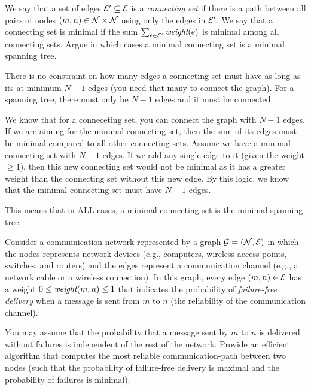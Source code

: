 \begin{problem}
\begin{questions}
\item We say that a set of edges $\mathcal{E}' \subseteq \mathcal{E}$ is a \emph{connecting set} if there is a path between all pairs of nodes $(m, n) \in \mathcal{N}\times\mathcal{N}$ using only the edges in $\mathcal{E}'$. We say that a connecting set is minimal if the sum $\sum_{e \in \mathcal{E}'} \mathord{\textit{weight}}(e)$ is minimal among all connecting sets. Argue in which cases a minimal connecting set is a minimal spanning tree.

There is no constraint on how many edges a connecting set must have as long as its at minimum $N-1$ edges (you need that many to connect the graph).
For a spanning tree, there must only be $N-1$ edges and it must be connected.

We know that for a conneceting set, you can connect the graph with $N-1$ edges. If we are aiming for the minimal connecting set, then the sum of its edges must be minimal compared to all other connecting sets. 
Assume we have a minimal connecting set with $N-1$ edges. If we add any single edge to it (given the weight $\geq 1$), then this new connecting set would not be minimal as it has a greater weight than the connecting set without this new edge.
By this logic, we know that the minimal connecting set must have $N-1$ edges.

This means that in ALL cases, a minimal connecting set is the minimal spanning tree.

\end{questions}
\end{problem}

\begin{problem}
Consider a communication network represented by a graph $\mathcal{G} = (\mathcal{N}, \mathcal{E})$ in which the nodes represents network devices (e.g., computers, wireless access points, switches, and routers) and the edges represent a communication channel (e.g., a network cable or a wireless connection). In this graph, every edge $(m, n) \in \mathcal{E}$ has a weight $0\leq\mathord{\textit{weight}}{(m, n)}\leq 1$ that indicates the probability of \emph{failure-free delivery} when a message is sent from $m$ to $n$ (the reliability of the communication channel).

You may assume that the probability that a message sent by $m$ to $n$ is delivered without failures is independent  of the rest of the network. Provide an efficient algorithm that computes the most reliable communication-path between two nodes (such that the probability of failure-free delivery is maximal and the probability of failures is minimal).
\end{problem}

